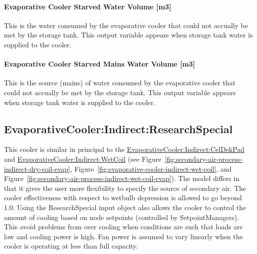 \paragraph{Evaporative Cooler Starved Water Volume {[}m3{]}}\label{evaporative-cooler-starved-water-volume-m3-3}

This is the water consumed by the evaporative cooler that could not accually be met by the storage tank. This output variable appears when storage tank water is supplied to the cooler.

\paragraph{Evaporative Cooler Starved Mains Water Volume {[}m3{]}}\label{evaporative-cooler-starved-mains-water-volume-m3-3}

This is the source (mains) of water consumed by the evaporative cooler that could not accually be met by the storage tank. This output variable appears when storage tank water is supplied to the cooler.

\subsection{EvaporativeCooler:Indirect:ResearchSpecial}\label{evaporativecoolerindirectresearchspecial}

This cooler is similar in principal to the \hyperref[evaporativecoolerindirectceldekpad]{EvaporativeCooler:Indirect:CelDekPad} and \hyperref[evaporativecoolerindirectwetcoil]{EvaporativeCooler:Indirect:WetCoil} (see Figure~\ref{fig:secondary-air-process-indirect-dry-coil-evap}, Figure~\ref{fig:evaporative-cooler-indirect-wet-coil}, and Figure~\ref{fig:secondary-air-process-indirect-wet-coil-evap}). The model differs in that it gives the user more flexibility to specify the source of secondary air. The cooler effectiveness with respect to wetbulb depression is allowed to go beyond 1.0. Using the ResearchSpecial input object also allows the cooler to control the amount of cooling based on node setpoints (controlled by SetpointManagers). This avoid problems from over cooling when conditions are such that loads are low and cooling power is high. Fan power is assumed to vary linearly when the cooler is operating at less than full capacity.

